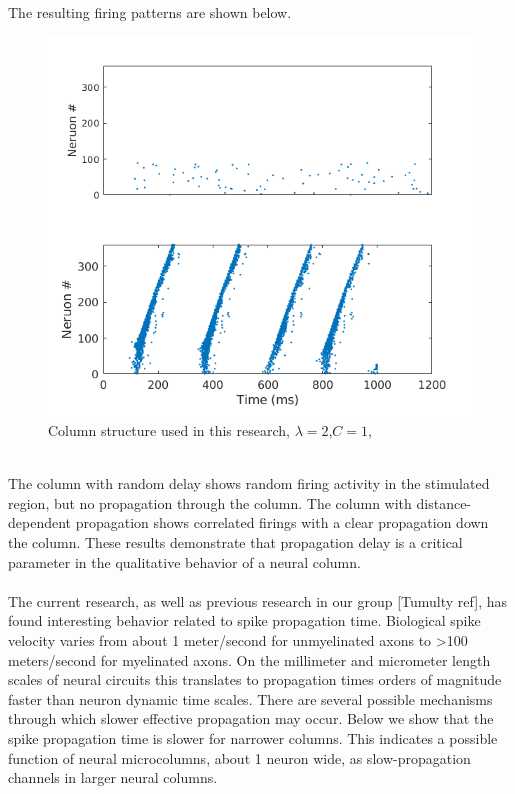 \documentclass[a4paper,11pt]{article}
\begin{document}
The resulting firing patterns are shown below.
\\
\begin{figure}[ht]
 \caption{Column structure used in this research, $\lambda=2$,$C=1$,}
 \centering
   \includegraphics[width=\textwidth]{fig/DelayCompare_RandInput}
\end{figure}
\\
The column with random delay shows random firing activity in the stimulated region, but no propagation through the column.
The column with distance-dependent propagation shows correlated firings with a clear propagation down the column.
These results demonstrate that propagation delay is a critical parameter in the qualitative behavior of a neural column.
\\ \\
The current research, as well as previous research in our group [Tumulty ref], has found interesting behavior related to spike propagation time.
Biological spike velocity varies from about 1 meter/second for unmyelinated axons to >100 meters/second for myelinated axons.
On the millimeter and micrometer length scales of neural circuits this translates to propagation times orders of magnitude faster than neuron dynamic time scales.
There are several possible mechanisms through which slower effective propagation may occur.
Below we show that the spike propagation time is slower for narrower columns. 
This indicates a possible function of neural microcolumns, about 1 neuron wide, as slow-propagation channels in larger neural columns.
\end{document}
